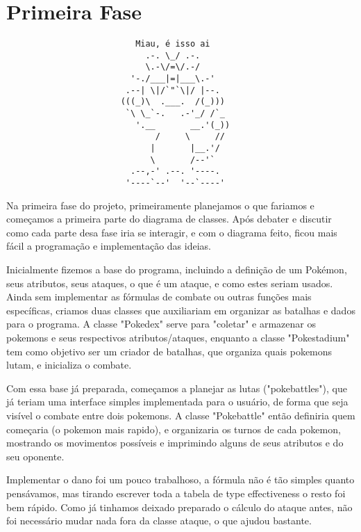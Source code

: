 \documentclass[a4paper]{article}
\begin{document}
\section{Primeira Fase}

\begin{verbatim}
                          Miau, é isso ai
                            .-. \_/ .-.
                            \.-\/=\/.-/
                         '-./___|=|___\.-'
                        .--| \|/`"`\|/ |--.
                       (((_)\  .___.  /(_)))
                        `\ \_`-.   .-'_/ /`_
                          '.__       __.'(_))
                              /     \     //
                             |       |__.'/
                             \       /--'`
                         .--,-' .--. '----.
                        '----`--'  '--`----'
\end{verbatim}

 Na primeira fase do projeto, primeiramente planejamos o que fariamos e
começamos a primeira parte do diagrama de classes. Após debater e discutir como
cada parte desa fase iria se interagir, e com o diagrama feito, ficou mais fácil
a programação e implementação das ideias.

    Inicialmente fizemos a base do programa, incluindo a definição de um
Pokémon, seus atributos, seus ataques, o que é um ataque, e como estes
seriam usados. Ainda sem implementar as fórmulas de combate ou outras funções
mais específicas, criamos duas classes que auxiliariam em organizar as
batalhas e dados para o programa. A classe "Pokedex" serve para "coletar" e
armazenar os pokemons e seus respectivos atributos/ataques, enquanto a classe
"Pokestadium" tem como objetivo ser um criador de batalhas, que organiza quais
pokemons lutam, e inicializa o combate.

    Com essa base já preparada, começamos a planejar as lutas ("pokebattles"),
que já teriam uma interface simples implementada para o usuário, de forma que
seja visível o combate entre dois pokemons. A classe "Pokebattle" então
definiria quem começaria (o pokemon mais rapido), e organizaria os turnos de
cada pokemon, mostrando os movimentos possíveis e imprimindo alguns de seus
atributos e do seu oponente.

    Implementar o dano foi um pouco trabalhoso, a fórmula não é tão simples
quanto pensávamos, mas tirando escrever toda a tabela de type effectiveness 
o resto foi bem rápido. Como já tinhamos deixado preparado o cálculo do ataque
antes, não foi necessário mudar nada fora da classe ataque, o que ajudou bastante.
\end{document}
